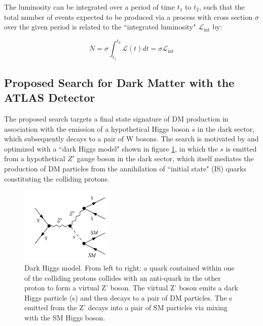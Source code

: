 \documentclass[12pt]{article}
\begin{document}
The luminosity can be integrated over a period of time $t_1$ to $t_2$, such that the total number of events expected to be produced via a process with cross section $\sigma$ over the given period is related to the ``integrated luminosity" $\mathcal{L}_\text{int}$ by:

\begin{equation}
N = \sigma\int_{t_1}^{t_2}\mathcal{L}(t)dt = \sigma\mathcal{L}_\text{int}
\end{equation}

\subsection{Proposed Search for Dark Matter with the ATLAS Detector}

The proposed search targets a final state signature of DM production in association with the emission of a hypothetical Higgs boson $s$ in the dark sector, which subsequently decays to a pair of W bosons. The search is motivated by and optimized with a ``dark Higgs model" \cite{dark_Higgs} shown in figure \ref{fig:signal_model}, in which the $s$ is emitted from a hypothetical $Z'$ gauge boson in the dark sector, which itself mediates the production of DM particles from the annihilation of ``initial state" (IS) quarks constituting the colliding protons.  

\begin{figure}[H]
	\centering
	\includegraphics[width=0.4\textwidth]{figures/Signal_generic.png}
	\caption[]{Dark Higgs model. From left to right: a quark contained within one of the colliding protons collides with an anti-quark in the other proton to form a virtual Z' boson. The virtual Z' boson emits a dark Higgs particle (s) and then decays to a pair of DM particles. The s emitted from the Z' decays into a pair of SM particles via mixing with the SM Higgs boson.}
	\label{fig:signal_model}
\end{figure}
\end{document}
